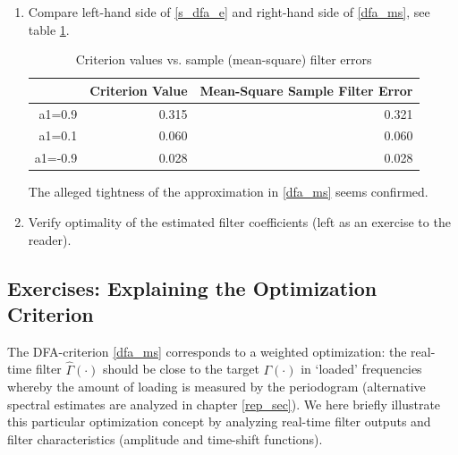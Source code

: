 \documentclass[a4paper]{book}
\begin{document}
\begin{enumerate}
\begin{Schunk}
\begin{Sinput}
> # Compute time-domain MSE
> mse<-apply(na.exclude((yhat-y))^2,2,mean)
> perf_mat[,2]<-mse
> round(perf_mat[,2],3)
\end{Sinput}
\begin{Soutput}
 a1=0.9  a1=0.1 a1=-0.9 
  0.321   0.060   0.028 
\end{Soutput}
\end{Schunk}
\item Compare left-hand side of \ref{s_dfa_e} and right-hand side of \ref{dfa_ms}, see table \ref{perf_mat}.\\ 
\begin{table}[ht]
\centering
\begin{tabular}{rrr}
  \hline
 & Criterion Value & Mean-Square Sample Filter Error \\ 
  \hline
a1=0.9 & 0.315 & 0.321 \\ 
  a1=0.1 & 0.060 & 0.060 \\ 
  a1=-0.9 & 0.028 & 0.028 \\ 
   \hline
\end{tabular}
\caption{Criterion values vs. sample (mean-square) filter errors} 
\label{perf_mat}
\end{table}The alleged tightness of the approximation in \ref{dfa_ms} seems confirmed.
\item Verify optimality of the estimated filter coefficients (left as an exercise to the reader).

\end{enumerate}



\subsection{Exercises: Explaining the Optimization Criterion}\label{ex_dfa}

The DFA-criterion \ref{dfa_ms} corresponds to a weighted optimization: the real-time filter $\hat{\Gamma}(\cdot)$ should be close to the target $\Gamma(\cdot)$ in `loaded' frequencies whereby the amount of loading is measured by the periodogram (alternative spectral estimates are analyzed in chapter \ref{rep_sec}). We here briefly illustrate this particular optimization concept by analyzing real-time filter outputs and filter characteristics (amplitude and time-shift functions).
\end{document}
